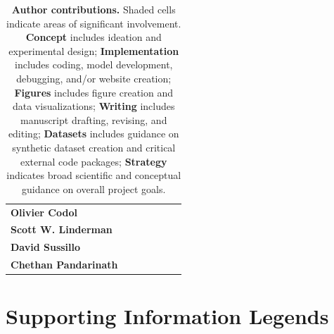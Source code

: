 \documentclass{article}
\begin{document}
\begin{table}[ht]
\begin{tabular}{lcccccc}
\textbf{Olivier Codol}
&                   %
& \cellcolor{gray!30} %
&                   %
& \cellcolor{gray!30} %
& \cellcolor{gray!30} %
&                   %
\\
\textbf{Scott W. Linderman}
& \cellcolor{gray!50} %
&                   %
&                   %
& \cellcolor{gray!50} %
&                   %
& \cellcolor{gray!50} %
\\
\textbf{David Sussillo}
& \cellcolor{gray!50} %
&                   %
&                   %
& \cellcolor{gray!50} %
&                   %
& \cellcolor{gray!50} %
\\
\textbf{Chethan Pandarinath}
& \cellcolor{gray!50} %
&                   %
& \cellcolor{gray!50}%
& \cellcolor{gray!50} %
&                   %
& \cellcolor{gray!50} %
\\
\bottomrule
\end{tabular}
\caption{\textbf{Author contributions.}
Shaded cells indicate areas of significant involvement.
\textbf{Concept} includes ideation and experimental design;
\textbf{Implementation} includes coding, model development, debugging, and/or website creation;
\textbf{Figures} includes figure creation and data visualizations;
\textbf{Writing} includes manuscript drafting, revising, and editing;
\textbf{Datasets} includes guidance on synthetic dataset creation and critical external code packages;
\textbf{Strategy} indicates broad scientific and conceptual guidance on overall project goals.}
\label{tab:author-contributions}
\end{table}


\newpage

\newpage

\printbibliography



\newpage




\section*{Supporting Information Legends}
\end{document}
